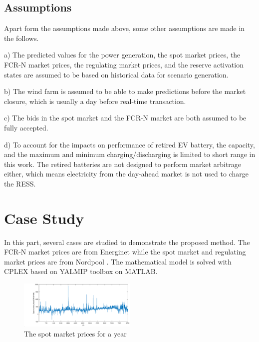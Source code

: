 \documentclass[final,5p,times,twocolumn,authoryear]{elsarticle}
\begin{document}
\subsection{Assumptions}
Apart form the assumptions made above, some other assumptions are made in the follows.

a) The predicted values for the power generation, the spot market prices, the FCR-N market prices, the regulating market prices, and the reserve activation states are assumed to be based on historical data for scenario generation.

b) The wind farm is assumed to be able to make predictions before the market closure, which is usually a day before real-time transaction.

c) The bids in the spot market and the FCR-N market are both assumed to be fully accepted.

d) To account for the impacts on performance of retired EV battery, the capacity, and the maximum and minimum charging/discharging is limited to short range in this work. The retired batteries are not designed to perform market arbitrage either, which means electricity from the day-ahead market is not used to charge the RESS.


\section{Case Study}
    In this part, several cases are studied to demonstrate the proposed method. The FCR-N market prices are from Energinet \cite{FCRNprice} while the spot market and regulating market prices are from Nordpool \cite{Nordpool}. The mathematical model is solved with CPLEX \cite{Cplex} based on YALMIP \cite{yalmip} toolbox on MATLAB.

\begin{figure}[h]
    \centering
    \includegraphics[width=0.5\textwidth]{figures/elspot.eps}
    \caption{The spot market prices for a year}
    \label{fig:elspot}
\end{figure}
\end{document}
